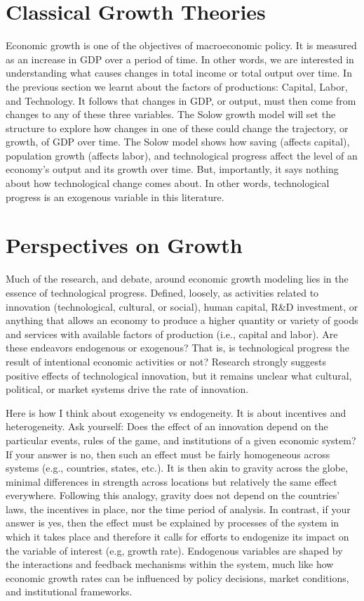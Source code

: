 \documentclass[10pt]{article}
\begin{document}
\section*{Classical Growth Theories}
Economic growth is one of the objectives of macroeconomic policy. It is measured as an increase in GDP over a period of time. In other words, we are interested in understanding what causes changes in total income or total output over time. In the previous section we learnt about the factors of productions: Capital, Labor, and Technology. It follows that changes in GDP, or output, must then come from changes to any of these three variables. The Solow growth model will set the structure to explore how changes in one of these could change the trajectory, or growth, of GDP over time. The Solow model shows how saving (affects capital), population growth (affects labor), and technological progress affect the level of an economy's output and its growth over time. But, importantly, it says nothing about how technological change comes about. In other words, technological progress is an exogenous variable in this literature.

\section*{Perspectives on Growth}
Much of the research, and debate, around economic growth modeling lies in the essence of technological progress. Defined, loosely, as activities related to innovation (technological, cultural, or social), human capital, R\&D investment, or anything that allows an economy to produce a higher quantity or variety of goods and services with available factors of production (i.e., capital and labor). Are these endeavors endogenous or exogenous? That is, is technological progress the result of intentional economic activities or not? Research strongly suggests positive effects of technological innovation, but it remains unclear what cultural, political, or market systems drive the rate of innovation.

Here is how I think about exogeneity vs endogeneity. It is about incentives and heterogeneity. Ask yourself: Does the effect of an innovation depend on the particular events, rules of the game, and institutions of a given economic system? If your answer is no, then such an effect must be fairly homogeneous across systems (e.g., countries, states, etc.). It is then akin to gravity across the globe, minimal differences in strength across locations but relatively the same effect everywhere. Following this analogy, gravity does not depend on the countries' laws, the incentives in place, nor the time period of analysis. In contrast, if your answer is yes, then the effect must be explained by processes of the system in which it takes place and therefore it calls for efforts to endogenize its impact on the variable of interest (e.g, growth rate). Endogenous variables are shaped by the interactions and feedback mechanisms within the system, much like how economic growth rates can be influenced by policy decisions, market conditions, and institutional frameworks.
\end{document}
